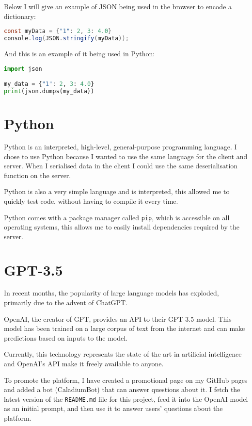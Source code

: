 Below I will give an example of JSON being used in the browser to encode a dictionary:

\begin{lstlisting}[language=Java]
const myData = {"1": 2, 3: 4.0}
console.log(JSON.stringify(myData));
\end{lstlisting}

And this is an example of it being used in Python:

\begin{lstlisting}[language=Python]
import json

my_data = {"1": 2, 3: 4.0}
print(json.dumps(my_data))
\end{lstlisting}

\section{Python}
Python is an interpreted, high-level, general-purpose programming language.
I chose to use Python because I wanted to use the same language for the client and server.
When I serialised data in the client I could use the same
deserialisation function on the server.

Python is also a very simple language and is interpreted,
this allowed me to quickly test code, without having to compile it every time.

Python comes with a package manager called \texttt{pip},
which is accessible on all operating systems,
this allows me to easily install dependencies required by the server.

\section{GPT-3.5}
In recent months, the popularity of large language models has exploded,
primarily due to the advent of ChatGPT.

OpenAI, the creator of GPT, provides an API to their GPT-3.5 model.
This model has been trained on a large corpus of text from the internet
and can make predictions based on inputs to the model.

Currently, this technology represents the state of the art in
artificial intelligence and OpenAI's API make it freely available to anyone.

To promote the platform, I have created a promotional page on
my GitHub pages and added a bot (CaladiumBot) that can answer questions about it.
I fetch the latest version of the \texttt{README.md} file for
this project, feed it into the OpenAI model as an initial prompt,
and then use it to answer users' questions about the platform.

